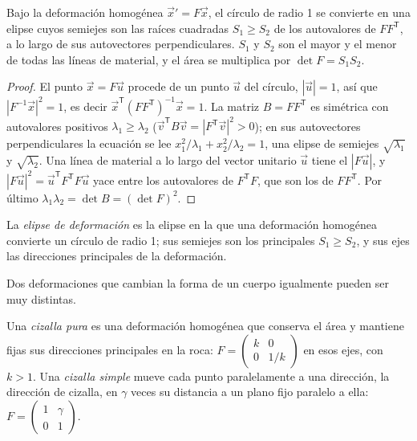 \begin{proposition}\label{prop:b1:stress-strain-rheology:ellipse}
Bajo la deformación homogénea $\vec x' = F\vec x$, el círculo de radio 1 se convierte en una elipse cuyos semiejes son las raíces cuadradas $S_1 \ge S_2$ de
los autovalores de $FF^{\mathsf T}$, a lo largo de sus autovectores perpendiculares. $S_1$ y $S_2$ son el mayor y el menor  de todas las líneas
de material, y el área se multiplica por $\det F = S_1S_2$.
\end{proposition}

\begin{proof}
El punto $\vec x = F\vec u$ procede de un punto $\vec u$ del círculo, $|\vec u| = 1$, así que $|F^{-1}\vec x|^2 = 1$, es decir
$\vec x^{\mathsf T}(FF^{\mathsf T})^{-1}\vec x = 1$. La matriz $B = FF^{\mathsf T}$ es simétrica con autovalores positivos $\lambda_1 \ge
\lambda_2$ ($\vec v^{\mathsf T}B\vec v = |F^{\mathsf T}\vec v|^2 > 0$); en sus autovectores perpendiculares la ecuación se lee
$x_1^2/\lambda_1 + x_2^2/\lambda_2 = 1$, una elipse de semiejes $\sqrt{\lambda_1}$ y $\sqrt{\lambda_2}$. Una línea de material a lo largo del vector
unitario $\vec u$ tiene el  $|F\vec u|$, y $|F\vec u|^2 = \vec u^{\mathsf T}F^{\mathsf T}F\vec u$ yace entre los autovalores de $F^{\mathsf T}F$,
que son los de $FF^{\mathsf T}$. Por último $\lambda_1\lambda_2 = \det B = (\det F)^2$.
\end{proof}

\begin{definition}\label{def:b1:stress-strain-rheology:strain-ellipse}
La \emph{elipse de deformación} es la elipse en la que una deformación homogénea convierte un círculo de radio 1; sus semiejes son
los  principales $S_1 \ge S_2$, y sus ejes las direcciones principales de la deformación.
\end{definition}

Dos deformaciones que cambian la forma de un cuerpo igualmente pueden ser muy distintas.

\begin{definition}\label{def:b1:stress-strain-rheology:shear-types}
Una \emph{cizalla pura} es una deformación homogénea que conserva el área y mantiene fijas sus direcciones principales en la roca:
$F = \begin{pmatrix} k & 0 \\ 0 & 1/k\end{pmatrix}$ en esos ejes, con $k > 1$. Una \emph{cizalla simple} mueve cada punto paralelamente a
una dirección, la dirección de cizalla, en $\gamma$ veces su distancia a un plano fijo paralelo a ella: $F = \begin{pmatrix} 1 & \gamma \\ 0 & 1\end{pmatrix}$.
\end{definition}

